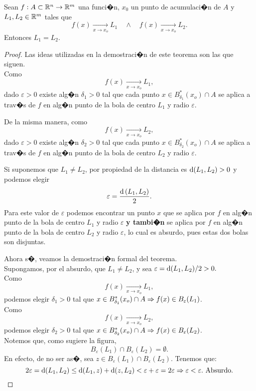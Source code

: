 \documentclass[a4paper]{scrartcl} %
\begin{document}
\begin{theorem} \label{teo:unicidad_limite}
\mbox{}

Sean $f:A \subset \mathbb{R}^n \to \mathbb{R}^m$ una funci�n, $x_0$ un punto de acumulaci�n de $A$ y $L_1, L_2 \in \mathbb{R}^m$ tales que 
\[
 f(x) \xrightarrow[x \to x_o]{} L_1 \quad \wedge \quad f(x) \xrightarrow[x \to x_o]{} L_2.
\]
Entonces $L_1 = L_2$.
\begin{proof}
\mbox{}

Las ideas utilizadas en la demostraci�n de este teorema son las que siguen.\\
Como 
\[
 f(x) \xrightarrow[x \to x_o]{} L_1,
\]
dado $\varepsilon > 0$ existe alg�n $\delta_1 > 0$ tal que cada punto $x \in B_{\delta_1}^*(x_o) \cap A$ se aplica a trav�s de $f$ en alg�n punto de la bola de centro $L_1$ y radio $\varepsilon$.

\def\Ro{2.0}
\def\Rb{1.0}
\def\Ra{3.0}
\def\sep{1.0*\Ro}




De la misma manera, como 
\[
 f(x) \xrightarrow[x \to x_o]{} L_2,
\]
dado $\varepsilon > 0$ existe alg�n $\delta_2 > 0$ tal que cada punto $x \in B_{\delta_2}^*(x_o) \cap A$ se aplica a trav�s de $f$ en alg�n punto de la bola de centro $L_2$ y radio $\varepsilon$.




Si suponemos que $L_1 \ne L_2$, por propiedad de la distancia es $\operatorname{d}(L_1,L_2) > 0$ y podemos elegir 
\[
 \varepsilon = \frac{\operatorname{d}{(L_1,L_2)}}{2}.
\]
Para este valor de $\varepsilon$ podemos encontrar un punto $x$ que se aplica por $f$ en alg�n punto de la bola de centro $L_1$ y radio $\varepsilon$ \textbf{y tambi�n} se aplica por $f$ en alg�n punto de la bola de centro $L_2$ y radio $\varepsilon$, lo cual es absurdo, pues estas dos bolas son disjuntas.



Ahora s�, veamos la demostraci�n formal del teorema.\\
 Supongamos, por el absurdo, que $L_1 \ne L_2$, y sea $\varepsilon = \operatorname{d}(L_1,L_2)/2 > 0.$ \\ 
 Como 
 \[
  f(x) \xrightarrow[x \to x_o]{} L_1,
 \]
podemos elegir $\delta_1 > 0$ tal que $x \in B_{\delta_1}^*(x_o) \cap A \Rightarrow f(x) \in B_{\varepsilon}(L_1)$.\\
Como 
\[
 f(x) \xrightarrow[x \to x_o]{} L_2,
\]
 podemos elegir $\delta_2 > 0$ tal que $x \in B_{\delta_2}^*(x_o) \cap A \Rightarrow f(x) \in B_{\varepsilon}(L_2)$.\\
 Notemos que, como sugiere la figura, 
 \[
  B_{\varepsilon}(L_1) \cap B_{\varepsilon}(L_2) = \emptyset.
 \]
 En efecto, de no ser as�, sea $z \in B_{\varepsilon}(L_1) \cap B_{\varepsilon}(L_2)$. Tenemos que:
 \[
  2 \varepsilon = \operatorname{d}(L_1,L_2) \le \operatorname{d}(L_1,z) + \operatorname{d}(z,L_2)
  < \varepsilon + \varepsilon = 2 \varepsilon \Rightarrow \varepsilon < \varepsilon. \text{ Absurdo.}
 \]


\end{proof}
\end{theorem}
\end{document}
